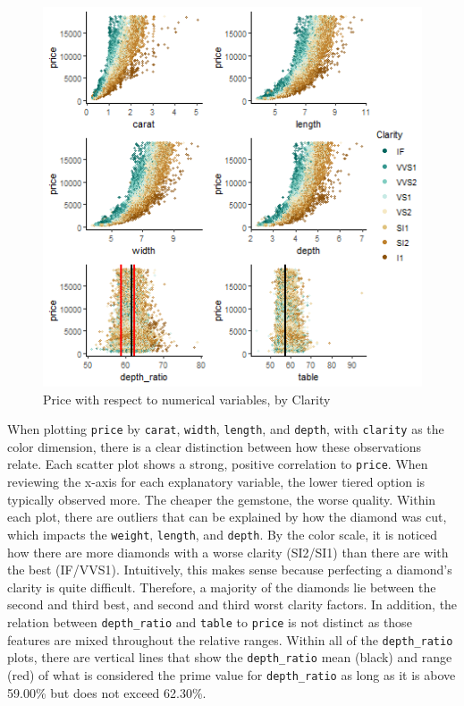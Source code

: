 \documentclass[
  paper=a4,
  ,captions=tableheading
]{scrartcl}
\begin{document}
\begin{figure}[H]

{\centering \includegraphics[width=\linewidth,]{Diamonds_PDF_files/figure-latex/Price by X and Clarity-1}

}

\caption{Price with respect to numerical variables, by Clarity}\label{fig:Price by X and Clarity}
\end{figure}

When plotting \texttt{price} by \texttt{carat}, \texttt{width},
\texttt{length}, and \texttt{depth}, with \texttt{clarity} as the color
dimension, there is a clear distinction between how these observations
relate. Each scatter plot shows a strong, positive correlation to
\texttt{price}. When reviewing the x-axis for each explanatory variable,
the lower tiered option is typically observed more. The cheaper the
gemstone, the worse quality. Within each plot, there are outliers that
can be explained by how the diamond was cut, which impacts the
\texttt{weight}, \texttt{length}, and \texttt{depth}. By the color
scale, it is noticed how there are more diamonds with a worse clarity
(SI2/SI1) than there are with the best (IF/VVS1). Intuitively, this
makes sense because perfecting a diamond's clarity is quite difficult.
Therefore, a majority of the diamonds lie between the second and third
best, and second and third worst clarity factors. In addition, the
relation between \texttt{depth\_ratio} and \texttt{table} to
\texttt{price} is not distinct as those features are mixed throughout
the relative ranges. Within all of the \texttt{depth\_ratio} plots,
there are vertical lines that show the \texttt{depth\_ratio} mean
(black) and range (red) of what is considered the prime value for
\texttt{depth\_ratio} as long as it is above 59.00\% but does not exceed
62.30\%.
\end{document}
